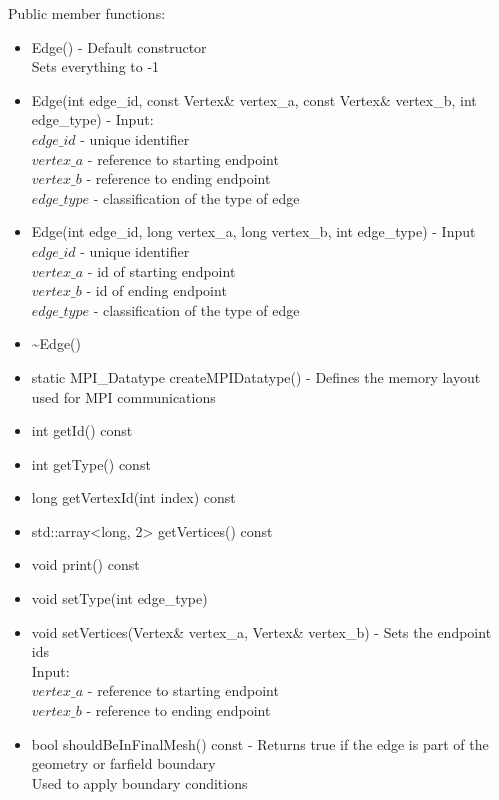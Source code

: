 \documentclass[manuscript, screen]{acmart}
\begin{document}
Public member functions:
\begin{itemize}
\item Edge() - Default constructor\\
Sets everything to -1

\item Edge(int edge\_id, const Vertex\& vertex\_a, const Vertex\& vertex\_b, int edge\_type) - Input:\\
$edge\_id$ - unique identifier\\
$vertex\_a$ - reference to starting endpoint\\
$vertex\_b$ - reference to ending endpoint\\
$edge\_type$ - classification of the type of edge

\item Edge(int edge\_id, long vertex\_a, long vertex\_b, int edge\_type) - Input\\
$edge\_id$ - unique identifier\\
$vertex\_a$ - id of starting endpoint\\
$vertex\_b$ - id of ending endpoint\\
$edge\_type$ - classification of the type of edge

\item \textasciitilde{}Edge()
%

\item static MPI\_Datatype createMPIDatatype() - Defines the memory layout used for MPI communications

\item int getId() const

\item int getType() const

\item long getVertexId(int index) const

\item std::array<long, 2> getVertices() const

\item void print() const

\item void setType(int edge\_type)

\item void setVertices(Vertex\& vertex\_a, Vertex\& vertex\_b) - Sets the endpoint ids\\
Input:\\
$vertex\_a$ - reference to starting endpoint\\
$vertex\_b$ - reference to ending endpoint

\item bool shouldBeInFinalMesh() const - Returns true if the edge is part of the geometry or farfield boundary\\
Used to apply boundary conditions
\end{itemize}
\end{document}
